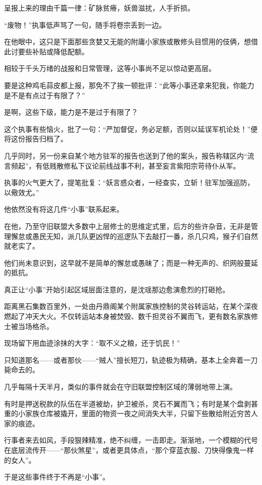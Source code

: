 呈报上来的理由千篇一律：矿脉贫瘠，妖兽滋扰，人手折损。

“废物！”执事低声骂了一句，随手将卷宗丢到一边。

在他眼中，这只是下面那些贪婪又无能的附庸小家族或散修头目惯用的伎俩，想借此讨要些补贴或降低配额。

相较于千头万绪的战报和日常管理，这等小事尚不足以惊动更高层。

要是这种鸡毛蒜皮都上报，那免不了挨一顿批评：“此等小事还拿来犯我，你能力是不是有点过于有限了？”

是啊，这些下级，能力是不是过于有限了？

这个执事有些恼火，批了一句：“严加督促，务必足额，否则以延误军机论处！”便将这份报告归档了。

几乎同时，另一份来自某个地方驻军的报告也送到了他的案头，报告称辖区内“流言频起”，有低贱散修私下议论前线战事不利，甚至妄言紫阳宗苛待仆从军。

执事的火气更大了，提笔批复：“妖言惑众者，一经查实，立斩！驻军加强巡防，以儆效尤。”

他依然没有将这几件“小事”联系起来。

在他，乃至守旧联盟大多数中上层修士的思维定式里，后方的些许杂音，无非是管理懈怠或愚民无知，派几队更凶悍的巡逻队下去敲打一番，杀几只鸡，猴子们自然就老实了。

他们尚未意识到，这早就不是简单的懈怠或愚昧了；而是一种无声的、织网般蔓延的抵抗。

真正让“小事”开始引起区域层面注意的，是沈瑶那边愈演愈烈的打砸抢。

距离黑石集数百里外，一处由丹鼎阁某个附属家族控制的灵谷转运站，在某个深夜燃起了冲天大火。不仅转运站本身被焚毁、数千担灵谷不翼而飞，更有数名家族修士被当场格杀。

现场留下用血迹涂抹的大字：“取不义之粮，还于饥民！”

只知道那名——或者那伙——“贼人”擅长短刀，轨迹极为精确，基本上全奔着一刀毙命去的。

几乎每隔十天半月，类似的事件就会在守旧联盟控制区域的薄弱地带上演。

有时是押送税款的队伍在半道被劫，护卫被杀，灵石不翼而飞；有时是某个盘剥甚重的小家族仓库被撬开，里面的物资一夜之间消失大半，只留下些散给附近穷苦人家的痕迹。

行事者来去如风，手段狠辣精准，绝不纠缠，一击即走。渐渐地，一个模糊的代号在底层流传开——“那伙煞星”，或者更具体点，“那个穿蓝衣服、刀快得像鬼一样的女人”。

\vspace{2em}

于是这些事件终于不再是“小事”。

